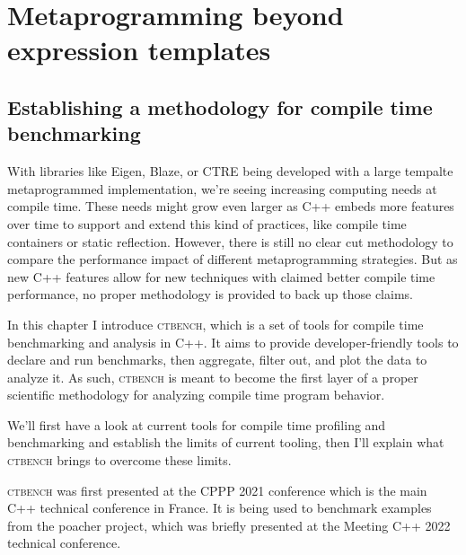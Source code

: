\documentclass[english,12pt,a4paper]{book}
\providecommand{\cpp}{\textsc{C++}\xspace}
\providecommand{\ctbench}{\textsc{ctbench}\xspace}
\begin{document}


\part{Metaprogramming beyond expression templates}

\chapter{
  Establishing a methodology for compile time benchmarking
}

With libraries like Eigen\cite{eigen}, Blaze\cite{blazelib}, or CTRE\cite{ctre}
being developed with a large tempalte metaprogrammed implementation, we're seeing
increasing computing needs at compile time. These needs might grow even larger
as \cpp embeds more features over time to support and extend this kind of
practices, like compile time containers\cite{more-constexpr-containers} or static
reflection\cite{static-reflection}. However, there is still no clear cut methodology
to compare the performance impact of different metaprogramming strategies. But
as new \cpp features allow for new techniques with claimed better compile time
performance, no proper methodology is provided to back up those claims.

In this chapter I introduce \ctbench, which is a set of tools for compile time
benchmarking and analysis in \cpp. It aims to provide developer-friendly tools
to declare and run benchmarks, then aggregate, filter out, and plot the data to
analyze it. As such, \ctbench is meant to become the first layer of a proper
scientific methodology for analyzing compile time program behavior.

We'll first have a look at current tools for compile time profiling and
benchmarking and establish the limits of current tooling, then I'll explain
what \ctbench brings to overcome these limits.

\ctbench was first presented at the CPPP 2021 conference\cite{ctbench-cppp21}
which is the main \cpp technical conference in France. It is being used to
benchmark examples from the poacher\cite{poacher} project, which was briefly
presented at the Meeting \cpp 2022\cite{meetingcpp22} technical conference.




\end{document}
